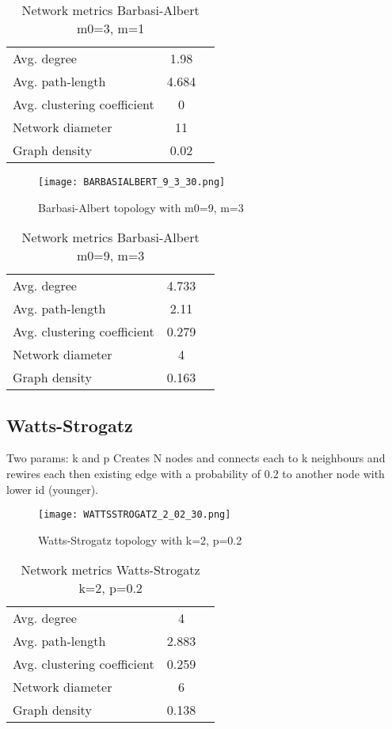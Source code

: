 \documentclass[Bachelorarbeit.tex]{subfiles}
\begin{document}
\begin{table}[h]
	\centering
	\caption{Network metrics Barbasi-Albert m0=3, m=1}
	\begin{tabular} { l c r }
		\hline
		Avg. degree & 1.98 \\
		Avg. path-length & 4.684 \\
		Avg. clustering coefficient & 0 \\
		Network diameter & 11 \\
		Graph density & 0.02 \\
		\hline
	\end{tabular}
\end{table}

\begin{figure}[H]
	\centering
  \texttt{[image: BARBASIALBERT\_9\_3\_30.png]}
	\caption{Barbasi-Albert topology with m0=9, m=3}
	\label{fig1}
\end{figure}

\begin{table}[h]
	\centering
	\caption{Network metrics Barbasi-Albert m0=9, m=3}
	\begin{tabular} { l c r }
		\hline
		Avg. degree & 4.733 \\
		Avg. path-length & 2.11 \\
		Avg. clustering coefficient & 0.279 \\
		Network diameter & 4 \\
		Graph density & 0.163 \\
		\hline
	\end{tabular}
\end{table}

\subsection{Watts-Strogatz}

Two params: k and p
Creates N nodes and connects each to k neighbours and rewires each then existing edge with a probability of 0.2 to another node with lower id (younger).

\begin{figure}[H]
	\centering
  \texttt{[image: WATTSSTROGATZ\_2\_02\_30.png]}
	\caption{Watts-Strogatz topology with k=2, p=0.2}
	\label{fig1}
\end{figure}

\begin{table}[h]
	\centering
	\caption{Network metrics Watts-Strogatz k=2, p=0.2}
	\begin{tabular} { l c r }
		\hline
		Avg. degree & 4 \\
		Avg. path-length & 2.883 \\
		Avg. clustering coefficient & 0.259 \\
		Network diameter & 6 \\
		Graph density & 0.138 \\
		\hline
	\end{tabular}
\end{table}
\end{document}
